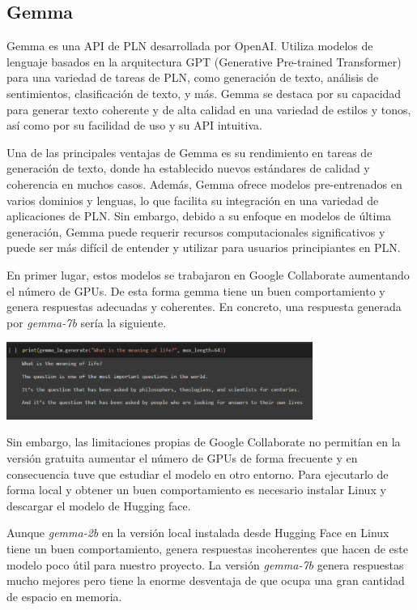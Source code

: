 \subsection{Gemma}

Gemma es una API de PLN desarrollada por OpenAI. Utiliza modelos de lenguaje basados en la arquitectura GPT (Generative Pre-trained Transformer) para una variedad de tareas de PLN, como generación de texto, análisis de sentimientos, clasificación de texto, y más. Gemma se destaca por su capacidad para generar texto coherente y de alta calidad en una variedad de estilos y tonos, así como por su facilidad de uso y su API intuitiva.

Una de las principales ventajas de Gemma es su rendimiento en tareas de generación de texto, donde ha establecido nuevos estándares de calidad y coherencia en muchos casos. Además, Gemma ofrece modelos pre-entrenados en varios dominios y lenguas, lo que facilita su integración en una variedad de aplicaciones de PLN. Sin embargo, debido a su enfoque en modelos de última generación, Gemma puede requerir recursos computacionales significativos y puede ser más difícil de entender y utilizar para usuarios principiantes en PLN.


En primer lugar, estos modelos se trabajaron en Google Collaborate aumentando el número de GPUs. De esta forma gemma tiene un buen comportamiento y genera respuestas adecuadas y coherentes. En concreto, una respuesta generada por \textit{gemma-7b} sería la siguiente.
\begin{center}
	\includegraphics[width=0.75\textwidth]{Imagenes/gemma (1)}
\end{center}
Sin embargo, las limitaciones propias de Google Collaborate no permitían en la versión gratuita aumentar el número de GPUs de forma frecuente y en consecuencia tuve que estudiar el modelo en otro entorno. Para ejecutarlo de forma local y obtener un buen comportamiento es necesario instalar Linux y descargar el modelo de Hugging face. 

Aunque \textit{gemma-2b} en la versión local instalada desde Hugging Face en Linux tiene un buen comportamiento, genera respuestas incoherentes que hacen de este modelo poco útil para nuestro proyecto. La versión \textit{gemma-7b} genera respuestas mucho mejores pero tiene la enorme desventaja de que ocupa una gran cantidad de espacio en memoria.

